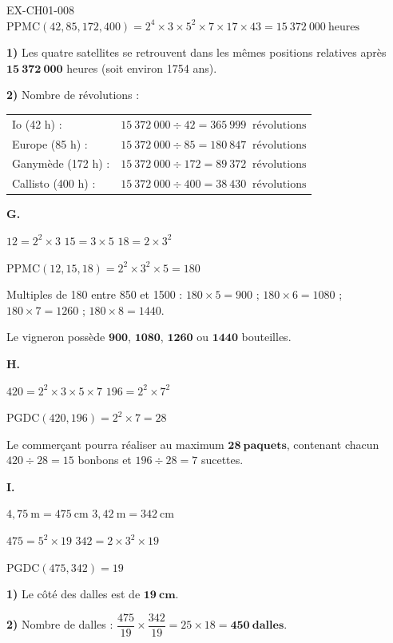 \begin{solution}{EX-CH01-008}
$\text{PPMC}(42, 85, 172, 400) = 2^4 \times 3 \times 5^2 \times 7 \times 17 \times 43 = 15\ 372\ 000\ \text{heures}$

\textbf{1)} Les quatre satellites se retrouvent dans les mêmes positions relatives après $\mathbf{15\ 372\ 000}$ heures (soit environ 1754 ans).

\textbf{2)} Nombre de révolutions :

\begin{tabular}{ll}
Io (42 h) :       & $15\ 372\ 000 \div 42 = 365\ 999\ \text{ révolutions}$ \\[4pt]
Europe (85 h) :   & $15\ 372\ 000 \div 85 = 180\ 847\ \text{ révolutions}$ \\[4pt]
Ganymède (172 h) :& $15\ 372\ 000 \div 172 = 89\ 372\ \text{ révolutions}$ \\[4pt]
Callisto (400 h) :& $15\ 372\ 000 \div 400 = 38\ 430\ \text{ révolutions}$ \\[4pt]
\end{tabular}

\bigskip
\textbf{G.}

$12 = 2^2 \times 3$ \quad $15 = 3 \times 5$ \quad $18 = 2 \times 3^2$

$\text{PPMC}(12, 15, 18) = 2^2 \times 3^2 \times 5 = 180$

Multiples de 180 entre 850 et 1500 : $180 \times 5 = 900$ ; $180 \times 6 = 1080$ ; $180 \times 7 = 1260$ ; $180 \times 8 = 1440$.

Le vigneron possède $\mathbf{900}$, $\mathbf{1080}$, $\mathbf{1260}$ ou $\mathbf{1440}$ bouteilles.

\bigskip
\textbf{H.}

$420 = 2^2 \times 3 \times 5 \times 7$ \quad $196 = 2^2 \times 7^2$

$\text{PGDC}(420, 196) = 2^2 \times 7 = 28$

Le commerçant pourra réaliser au maximum $\mathbf{28\ paquets}$, contenant chacun $420 \div 28 = 15$ bonbons et $196 \div 28 = 7$ sucettes.

\bigskip
\textbf{I.}

$4{,}75\ \text{m} = 475\ \text{cm}$ \quad $3{,}42\ \text{m} = 342\ \text{cm}$

$475 = 5^2 \times 19$ \quad $342 = 2 \times 3^2 \times 19$

$\text{PGDC}(475, 342) = 19$

\textbf{1)} Le côté des dalles est de $\mathbf{19\ cm}$.

\textbf{2)} Nombre de dalles : $\dfrac{475}{19} \times \dfrac{342}{19} = 25 \times 18 = \mathbf{450\ dalles}$.


\end{solution}
